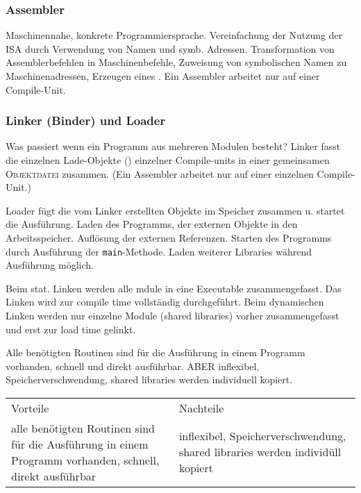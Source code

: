 \subsubsection{Assembler}
Maschinennahe, konkrete Programmiersprache. Vereinfachung der Nutzung der ISA durch Verwendung von Namen und symb. Adressen. 
Transformation von Assemblerbefehlen in Maschinenbefehle, Zuweisung von symbolischen Namen zu Maschinenadressen, Erzeugen eines . Ein Assembler arbeitet nur auf einer Compile-Unit. 

\subsubsection{Linker (Binder) und Loader}
Was passiert wenn ein Programm aus mehreren Modulen besteht?
Linker fasst die einzelnen Lade-Objekte () einzelner Compile-units in einer gemeinsamen \textsc{Objektdatei} zusammen. (Ein Assembler arbeitet nur auf einer einzelnen Compile-Unit.) 

Loader fügt die vom Linker erstellten Objekte im Speicher zusammen u. startet die Ausführung. Laden des Programms, der externen Objekte in den Arbeitsspeicher. Auflösung der externen Referenzen. Starten des Programms durch Ausführung der \texttt{main}-Methode. Laden weiterer Libraries während Ausführung möglich. 

Beim stat. Linken werden alle mdule in eine Executable zusammengefasst. Das Linken wird zur compile time vollständig durchgeführt. Beim dynamischen Linken werden nur einzelne Module (shared libraries) vorher zusammengefasst und erst zur load time gelinkt. 

Alle benötigten Routinen sind für die Ausführung in einem Programm vorhanden, schnell und direkt ausführbar. ABER inflexibel, Speicherverschwendung, shared libraries werden individuell kopiert. 

\begin{tabularx}{\textwidth}{X X}
	Vorteile& Nachteile\\
	alle benötigten Routinen sind für die Ausführung in einem Programm vorhanden, schnell, direkt ausführbar& inflexibel, Speicherverschwendung, shared libraries werden individüll kopiert\\ 
\end{tabularx}
